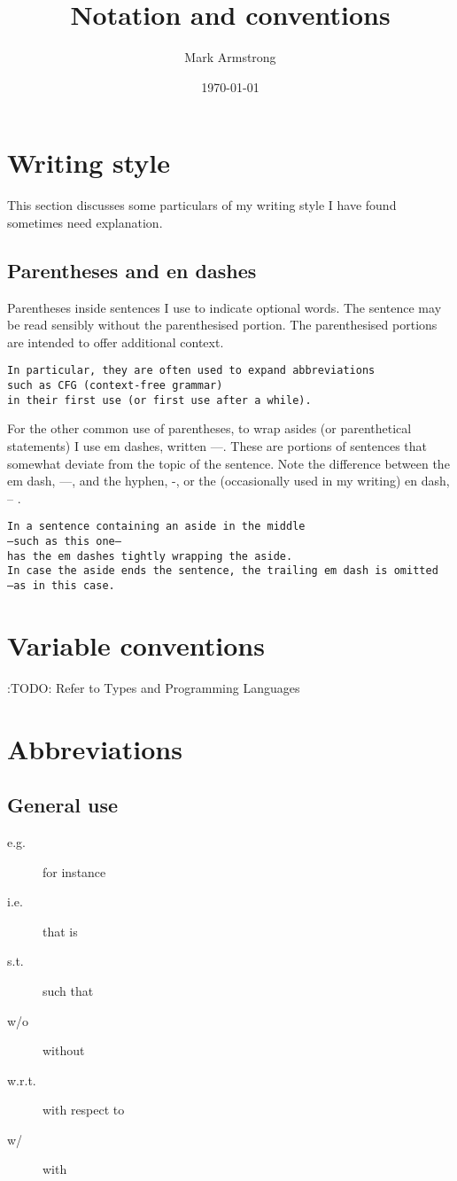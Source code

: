 \documentclass[11pt]{article}
\author{Mark Armstrong}
\date{\today}
\title{Notation and conventions}
\begin{document}
\maketitle
\tableofcontents


\section{Writing style}
\label{sec:orgf29392e}
This section discusses some particulars of my writing style
I have found sometimes need explanation.

\subsection{Parentheses and en dashes}
\label{sec:org4ee2a3f}
Parentheses inside sentences I use to indicate optional words.
The sentence may be read sensibly without the parenthesised portion.
The parenthesised portions are intended to offer additional context.
\begin{verbatim}
In particular, they are often used to expand abbreviations
such as CFG (context-free grammar)
in their first use (or first use after a while).
\end{verbatim}

For the other common use of parentheses, to wrap asides
(or parenthetical statements) I use em dashes, written —.
These are portions of sentences that somewhat deviate
from the topic of the sentence.
Note the difference between the em dash, —, and the hyphen, -,
or the (occasionally used in my writing) en dash, – .
\begin{verbatim}
In a sentence containing an aside in the middle
—such as this one—
has the em dashes tightly wrapping the aside.
In case the aside ends the sentence, the trailing em dash is omitted
—as in this case.
\end{verbatim}

\section{Variable conventions}
\label{sec:org03b2516}
:TODO: Refer to Types and Programming Languages

\section{Abbreviations}
\label{sec:org404079c}
\subsection{General use}
\label{sec:org91ad06e}
\begin{description}
\item[{e.g.}] for instance
\item[{i.e.}] that is
\item[{s.t.}] such that
\item[{w/o}] without
\item[{w.r.t.}] with respect to
\item[{w/}] with
\end{description}
\end{document}
